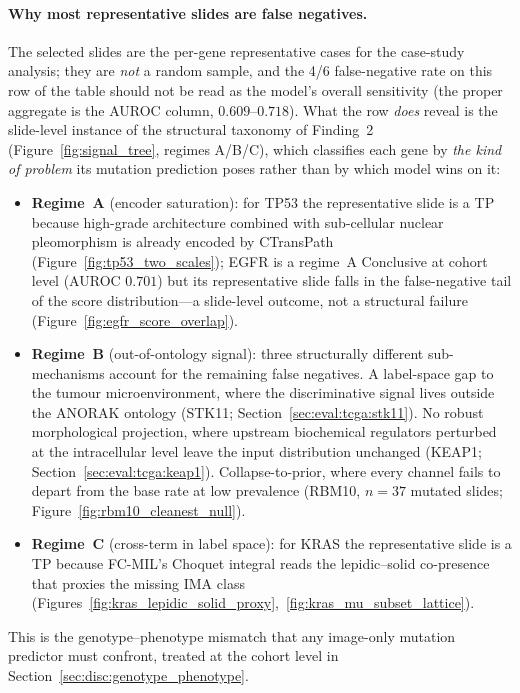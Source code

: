 \paragraph{Why most representative slides are false negatives.}
The selected slides are the per-gene representative cases for
the case-study analysis; they are \emph{not} a random sample,
and the 4/6 false-negative rate on this row of the table should
not be read as the model's overall sensitivity (the proper
aggregate is the AUROC column,
$0.609$--$0.718$).
What the row \emph{does} reveal is the slide-level instance of
the structural taxonomy of Finding~2
(Figure~\ref{fig:signal_tree}, regimes A/B/C),
which classifies each gene by \emph{the kind of problem} its
mutation prediction poses rather than by which model wins on it:
\begin{itemize}
  \item \textbf{Regime~A} (encoder saturation): for TP53 the
    representative slide is a TP because high-grade architecture
    combined with sub-cellular nuclear pleomorphism is already
    encoded by CTransPath
    (Figure~\ref{fig:tp53_two_scales}); EGFR is a regime~A
    Conclusive at cohort level (AUROC $0.701$) but its
    representative slide falls in the false-negative tail of
    the score distribution---a slide-level outcome, not a
    structural failure
    (Figure~\ref{fig:egfr_score_overlap}).
  \item \textbf{Regime~B} (out-of-ontology signal): three
    structurally different sub-mechanisms account for the
    remaining false negatives.
    A label-space gap to the tumour microenvironment, where the
    discriminative signal lives outside the ANORAK ontology
    (STK11; Section~\ref{sec:eval:tcga:stk11}).
    No robust morphological projection, where upstream
    biochemical regulators perturbed at the intracellular level
    leave the input distribution unchanged
    (KEAP1; Section~\ref{sec:eval:tcga:keap1}).
    Collapse-to-prior, where every channel fails to depart from
    the base rate at low prevalence
    (RBM10, $n = 37$ mutated slides;
    Figure~\ref{fig:rbm10_cleanest_null}).
  \item \textbf{Regime~C} (cross-term in label space): for
    KRAS the representative slide is a TP because FC-MIL's
    Choquet integral reads the lepidic--solid co-presence that
    proxies the missing IMA class
    (Figures~\ref{fig:kras_lepidic_solid_proxy},~\ref{fig:kras_mu_subset_lattice}).
\end{itemize}
This is the genotype--phenotype mismatch that any image-only
mutation predictor must confront, treated at the cohort level
in Section~\ref{sec:disc:genotype_phenotype}.

